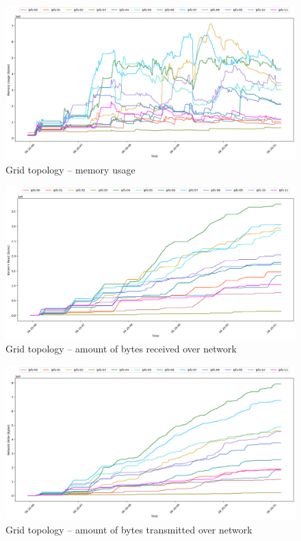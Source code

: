 \begin{figure}[H]
\includegraphics[width=\linewidth]{figures/grid/mem_usage.png}
\caption{Grid topology -- memory usage}
\end{figure}
\begin{figure}[H]
\includegraphics[width=\linewidth]{figures/grid/net_read.png}
\caption{Grid topology -- amount of bytes received over network}
\end{figure}
\begin{figure}[H]
\includegraphics[width=\linewidth]{figures/grid/net_write.png}
\caption{Grid topology -- amount of bytes transmitted over network}
\end{figure}


